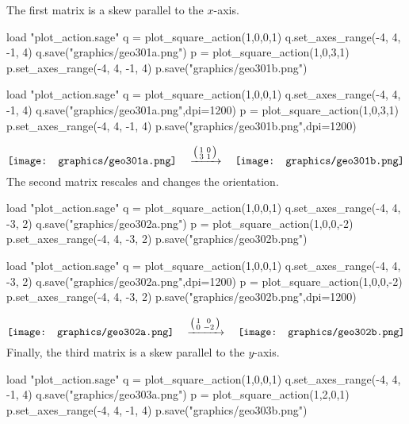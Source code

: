 The first matrix is a skew parallel to the $x$-axis.
\begin{sageoutput}[d,0,4;d,5,7]
load "plot_action.sage"
q = plot_square_action(1,0,0,1) 
q.set_axes_range(-4, 4, -1, 4) 
q.save("graphics/geo301a.png")
p = plot_square_action(1,0,3,1) 
p.set_axes_range(-4, 4, -1, 4) 
p.save("graphics/geo301b.png")
\end{sageoutput}
\begin{sagesilent}
load "plot_action.sage"
q = plot_square_action(1,0,0,1) 
q.set_axes_range(-4, 4, -1, 4) 
q.save("graphics/geo301a.png",dpi=1200)
p = plot_square_action(1,0,3,1) 
p.set_axes_range(-4, 4, -1, 4) 
p.save("graphics/geo301b.png",dpi=1200)
\end{sagesilent}
\begin{equation*}
  \vcenteredhbox{\texttt{[image: graphics/geo301a.png]}}
  \quad\mapsvia{\big (\begin{smallmatrix} 1 &0 \\ 3 &1 \end{smallmatrix}\big )}\quad
  \vcenteredhbox{\texttt{[image: graphics/geo301b.png]}}
\end{equation*}
\noindent
The second matrix rescales and changes the orientation.
\begin{sageoutput}[d,0,4;d,5,7]
load "plot_action.sage"
q = plot_square_action(1,0,0,1) 
q.set_axes_range(-4, 4, -3, 2) 
q.save("graphics/geo302a.png")
p = plot_square_action(1,0,0,-2) 
p.set_axes_range(-4, 4, -3, 2) 
p.save("graphics/geo302b.png")
\end{sageoutput}
\begin{sagesilent}
load "plot_action.sage"
q = plot_square_action(1,0,0,1) 
q.set_axes_range(-4, 4, -3, 2) 
q.save("graphics/geo302a.png",dpi=1200)
p = plot_square_action(1,0,0,-2) 
p.set_axes_range(-4, 4, -3, 2) 
p.save("graphics/geo302b.png",dpi=1200)
\end{sagesilent}
\begin{equation*}
  \vcenteredhbox{\texttt{[image: graphics/geo302a.png]}}
  \quad\mapsvia{\big (\begin{smallmatrix} 1 &0 \\ 0 &-2 \end{smallmatrix}\big )}\quad
  \vcenteredhbox{\texttt{[image: graphics/geo302b.png]}}
\end{equation*}
\noindent
Finally, the third matrix is a skew parallel to the $y$-axis.
\begin{sageoutput}[d,0,4;d,5,7]
load "plot_action.sage"
q = plot_square_action(1,0,0,1) 
q.set_axes_range(-4, 4, -1, 4) 
q.save("graphics/geo303a.png")
p = plot_square_action(1,2,0,1) 
p.set_axes_range(-4, 4, -1, 4) 
p.save("graphics/geo303b.png")
\end{sageoutput}
